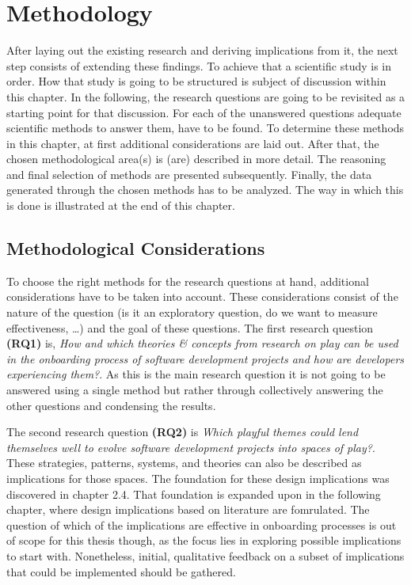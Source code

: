 \section{Methodology}

After laying out the existing research and deriving implications from it, the next step consists of extending these findings. To achieve that a scientific study is in order. How that study is going to be structured is subject of discussion within this chapter. In the following, the research questions are going to be revisited as a starting point for that discussion. For each of the unanswered questions adequate scientific methods to answer them, have to be found. To determine these methods in this chapter, at first additional considerations are laid out. After that, the chosen methodological area(s) is (are) described in more detail. The reasoning and final selection of methods are presented subsequently. Finally, the data generated through the chosen methods has to be analyzed. The way in which this is done is illustrated at the end of this chapter.

\subsection{Methodological Considerations}

To choose the right methods for the research questions at hand, additional considerations have to be taken into account. These considerations consist of the nature of the question (is it an exploratory question, do we want to measure effectiveness, \ldots) and the goal of these questions. The first research question \textbf{(RQ1)} is, \textit{How and which theories \& concepts from research on play can be used in the onboarding process of software development projects and how are developers experiencing them?}. As this is the main research question it is not going to be answered using a single method but rather through collectively answering the other questions and condensing the results.

The second research question \textbf{(RQ2)} is \textit{Which playful themes could lend themselves well to evolve software development projects into spaces of play?}. These strategies, patterns, systems, and theories can also be described as implications for those spaces. The foundation for these design implications was discovered in chapter 2.4. That foundation is expanded upon in the following chapter, where design implications based on literature are fomrulated. The question of which of the implications are effective in onboarding processes is out of scope for this thesis though, as the focus lies in exploring possible implications to start with. Nonetheless, initial, qualitative feedback on a subset of implications that could be implemented should be gathered.

